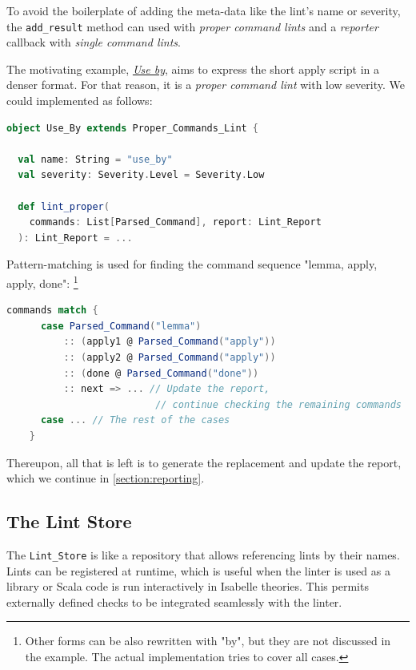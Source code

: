 To avoid the boilerplate of adding the meta-data like the lint's name or 
severity, the \texttt{add\_result} method can used with \textit{proper command 
lints} and a \textit{reporter} callback with \textit{single command lints}.

The motivating example, \hyperref[lint:useby]{\textit{Use by}}, aims to express the short apply
script in a denser format. For that reason, it is a \textit{proper command lint}
with low severity. We could implemented as follows:\\
\begin{minipage}{\linewidth}
\begin{lstlisting}[language=scala]
object Use_By extends Proper_Commands_Lint {

  val name: String = "use_by"
  val severity: Severity.Level = Severity.Low
  
  def lint_proper(
    commands: List[Parsed_Command], report: Lint_Report
  ): Lint_Report = ...
\end{lstlisting}
\end{minipage}


Pattern-matching is used for finding the command sequence "lemma, apply, apply, 
done": \footnote{Other forms
can be also rewritten with "by", but they are not discussed in the 
example. The actual implementation tries to cover all cases.}
\lstset{keepspaces=true}
\begin{lstlisting}[language=scala, keepspaces=true, gobble=0]
    commands match {
      case Parsed_Command("lemma")
          :: (apply1 @ Parsed_Command("apply"))
          :: (apply2 @ Parsed_Command("apply"))
          :: (done @ Parsed_Command("done"))
          :: next => ... // Update the report, 
                          // continue checking the remaining commands
      case ... // The rest of the cases
    }
\end{lstlisting}
Thereupon, all that is left is to generate the replacement and update the
report, which we continue in \autoref{section:reporting}.

\subsection{The Lint Store}
The \texttt{Lint\_Store} is like a repository that allows referencing lints by 
their
names. Lints can be registered at runtime, which is useful when the linter is used as 
a library or Scala code is run interactively in Isabelle theories.
This permits externally defined checks to be integrated seamlessly with the linter.

